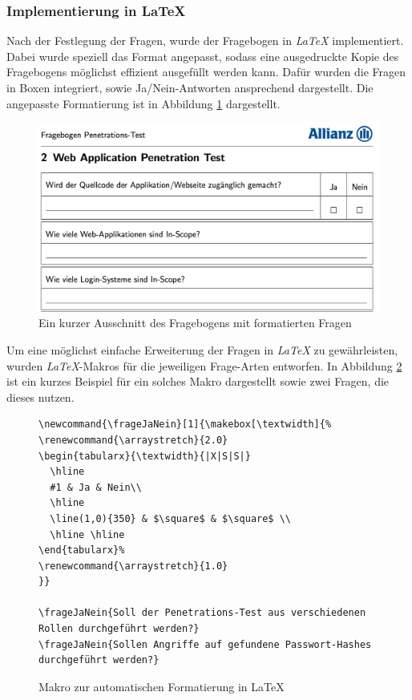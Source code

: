 \subsubsection{Implementierung in LaTeX}\label{ref:AufImplInTex}
Nach der Festlegung der Fragen, wurde der Fragebogen in \textit{LaTeX} implementiert. Dabei wurde speziell das Format angepasst, sodass eine ausgedruckte Kopie des Fragebogens möglichst effizient ausgefüllt werden kann. Dafür wurden die Fragen in Boxen integriert, sowie Ja/Nein-Antworten ansprechend dargestellt. Die angepasste Formatierung ist in Abbildung \ref{fig:FragLatex} dargestellt.\\

\begin{figure}[htbp]
	\centering
	\includegraphics[width=\textwidth]{bilder/pentest_prozesse/vorbereitung/fragebogen_latex.png}
	\caption{Ein kurzer Ausschnitt des Fragebogens mit formatierten Fragen}
	\label{fig:FragLatex}
\end{figure}

Um eine möglichst einfache Erweiterung der Fragen in \textit{LaTeX} zu gewährleisten, wurden \textit{LaTeX}-Makros für die jeweiligen Frage-Arten entworfen. In Abbildung \ref{lst:PenProzVorbAutFormat} ist ein kurzes Beispiel für ein solches Makro dargestellt sowie zwei Fragen, die dieses nutzen.

\begin{figure}
\lstset{language=Tex}
\begin{lstlisting}
\newcommand{\frageJaNein}[1]{\makebox[\textwidth]{%
\renewcommand{\arraystretch}{2.0}
\begin{tabularx}{\textwidth}{|X|S|S|}
  \hline
  #1 & Ja & Nein\\
  \hline
  \line(1,0){350} & $\square$ & $\square$ \\
  \hline \hline
\end{tabularx}%
\renewcommand{\arraystretch}{1.0}
}}

\frageJaNein{Soll der Penetrations-Test aus verschiedenen Rollen durchgeführt werden?}
\frageJaNein{Sollen Angriffe auf gefundene Passwort-Hashes durchgeführt werden?}
\end{lstlisting}
\caption{Makro zur automatischen Formatierung in LaTeX}
\label{lst:PenProzVorbAutFormat}
\end{figure}

